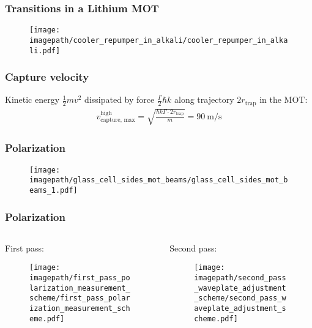 \begin{frame}
    \frametitle{Transitions in a Lithium MOT}
    \begin{figure}
        \centering
        \texttt{[image: \\imagepath/cooler\_repumper\_in\_alkali/cooler\_repumper\_in\_alkali.pdf]}
    \end{figure}
\end{frame}

\begin{frame}
    \frametitle{Capture velocity}
    Kinetic energy $\frac{1}{2}mv^2$ dissipated by force $\frac{\Gamma}{2} \hbar k$ along trajectory $2 r_\text{trap}$ in the MOT:
    \begin{align*}\label{eq:capture_velocity_high}
        v_\text{capture, max}^\text{high} = \sqrt{\frac{\hbar k \Gamma \cdot 2 r_\text{trap}}{m}} = \SI[]{90}{\meter\per\second}
    \end{align*}
\end{frame}

\begin{frame}
    \frametitle{Polarization}
    \begin{figure}
        \texttt{[image: \\imagepath/glass\_cell\_sides\_mot\_beams/glass\_cell\_sides\_mot\_beams\_1.pdf]}
    \end{figure}
\end{frame}

\begin{frame}
    \frametitle{Polarization}
    \begin{columns}
        \begin{column}[]{0.45\textwidth}
            \centering
            First pass:
            \begin{figure}
                \texttt{[image: \\imagepath/first\_pass\_polarization\_measurement\_scheme/first\_pass\_polarization\_measurement\_scheme.pdf]}
            \end{figure}
        \end{column}
        \begin{column}[]{0.55\textwidth}
            \centering
            Second pass:
            \begin{figure}
                \texttt{[image: \\imagepath/second\_pass\_waveplate\_adjustment\_scheme/second\_pass\_waveplate\_adjustment\_scheme.pdf]}
            \end{figure}
        \end{column}
    \end{columns}
\end{frame}

